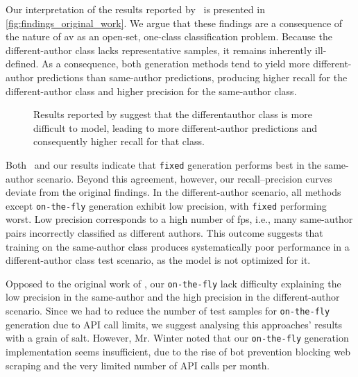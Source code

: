 Our interpretation of the results reported by \citet{koppel_determining_2014}\ is presented in \autoref{fig:findings_original_work}.
We argue that these findings are a consequence of the nature of \ac{av} as an open-set, one-class classification problem.
Because the different-author class lacks representative samples, it remains inherently ill-defined.
As a consequence, both \imp{} generation methods tend to yield more different-author predictions than same-author predictions, producing higher recall for the different-author class and higher precision for the same-author class.

\begin{figure}[htbp]
    \centering
    
    \caption[Aggregating original \impAppr{} experiment results.]{Results reported by \citet{koppel_determining_2014} suggest that the different\-author class is more difficult to model, leading to more different-author predictions and consequently higher recall for that class.}
    \label{fig:findings_original_work}
\end{figure}

Both \citet{koppel_determining_2014}\ and our results indicate that \texttt{fixed} \imp{} generation performs best in the same-author scenario.
Beyond this agreement, however, our recall–precision curves deviate from the original findings.
In the different-author scenario, all methods except \texttt{on-the-fly} generation exhibit low precision, with \texttt{fixed} \imps{} performing worst.
Low precision corresponds to a high number of \acp{fp}, i.e., many same-author pairs incorrectly classified as different authors.
This outcome suggests that training on the same-author class produces systematically poor performance in a different-author class test scenario, as the model is not optimized for it.

Opposed to the original work of \citet{koppel_determining_2014}, our \texttt{on-the-fly} \imps{} lack difficulty explaining the low precision in the same-author and the high precision in the different-author scenario.
Since we had to reduce the number of test samples for \texttt{on-the-fly} \imp{} generation due to API call limits, we suggest analysing this approaches' results with a grain of salt.
However, Mr. Winter noted that our \texttt{on-the-fly} \imp{} generation implementation seems insufficient, due to the rise of bot prevention blocking web scraping and the very limited number of API calls per month.

